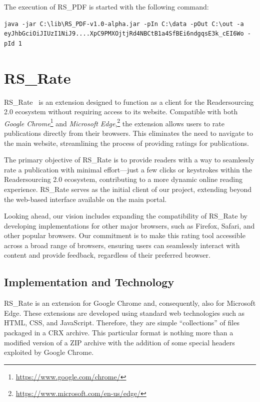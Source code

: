 \documentclass[a4paper, english]{article}
\newcommand{\rspdf}{RS\_PDF\xspace}
\newcommand{\rsrate}{RS\_Rate\xspace}
\begin{document}
The execution of \rspdf is started with the following command:

\begin{lstlisting}
java -jar C:\lib\RS_PDF-v1.0-alpha.jar -pIn C:\data -pOut C:\out -a eyJhbGciOiJIUzI1NiJ9....XpC9PMXOjtjRd4NBCtB1a4SfBEi6ndgqsE3k_cEI6Wo -pId 1
\end{lstlisting}

\section{\rsrate}

\label{rs-rate}

\rsrate~\cite{RS-Rate} is an extension designed to function as a client for the Readersourcing 2.0 ecosystem without requiring access to its website. Compatible with both \emph{Google Chrome}\footnote{\url{https://www.google.com/chrome/}} and \emph{Microsoft Edge},\footnote{\url{https://www.microsoft.com/en-us/edge/}} the extension allows users to rate publications directly from their browsers. This eliminates the need to navigate to the main website, streamlining the process of providing ratings for publications.

The primary objective of \rsrate is to provide readers with a way to seamlessly rate a publication with minimal effort—just a few clicks or keystrokes within the Readersourcing 2.0 ecosystem, contributing to a more dynamic online reading experience. \rsrate serves as the initial client of our project, extending beyond the web-based interface available on the main portal.

Looking ahead, our vision includes expanding the compatibility of \rsrate by developing implementations for other major browsers, such as Firefox, Safari, and other popular browsers. Our commitment is to make this rating tool accessible across a broad range of browsers, ensuring users can seamlessly interact with content and provide feedback, regardless of their preferred browser.

\subsection{Implementation and Technology}

\rsrate is an extension for Google Chrome and, consequently, also for Microsoft Edge. These extensions are developed using standard web technologies such as HTML, CSS, and JavaScript. Therefore, they are simple ``collections'' of files packaged in a CRX archive. This particular format is nothing more than a modified version of a ZIP archive with the addition of some special headers exploited by Google Chrome.
\end{document}

